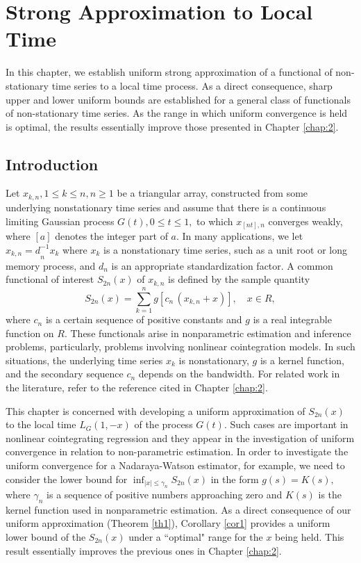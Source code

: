 \chapter{Strong Approximation to Local Time} 
\ifpdf
    \graphicspath{{Chapter3/Chapter3Figs/PNG/}{Chapter3/Chapter3Figs/PDF/}{Chapter3/Chapter3Figs/}}
\else
    \graphicspath{{Chapter3/Chapter3Figs/EPS/}{Chapter3/Chapter3Figs/}}
\fi

In this chapter, we establish uniform strong approximation of a functional of non-stationary time series to a local time process. As a direct consequence, sharp upper and lower uniform bounds are established for a general class of functionals of non-stationary time series. As the range in which uniform convergence is held is optimal, the results essentially improve those presented in Chapter \ref{chap:2}.

\section{Introduction}
Let ${x_{k,n},1\leq k\leq n,n\geq 1}$
 be  a triangular  array, constructed from some
underlying nonstationary time series and assume that there is a continuous
limiting Gaussian process $G(t),0\leq t\leq 1,$ to which $x_{[nt],n}$
converges weakly, where $[a]$ denotes the integer part of $a.$ In many applications, we let ${x_{k,n}=d}_{n}^{-1}{x}%
_{k}$ where $x_{k}$ is a nonstationary time series, such as a unit root or
long memory process, and $d_{n}$ is an appropriate standardization
factor. A common functional of interest $S_{2n}(x)$ of $x_{k,n}$ is defined by
the sample quantity%
\begin{equation}
S_{2n} (x)=\sum_{k=1}^{n}g[c_{n}\,(x_{k,n}+x)], \quad x\in R,
\end{equation}
where $c_{n}$ is a certain sequence of positive constants and $g$ is a real
integrable function on $R$. These functionals arise in nonparametric
estimation and inference  problems, particularly, problems involving nonlinear cointegration
models. In such situations, the underlying time series $x_{k}$ is nonstationary, $g$ is a
kernel function, and the secondary sequence $c_{n}$ depends on the bandwidth. For related work in the literature, refer to the reference cited in Chapter \ref{chap:2}.

This chapter is concerned with developing a uniform approximation of $S_{2n}(x)$ to the local time $L_{G}(1,-x)$ of the process $G(t)$. Such cases are important in nonlinear cointegrating regression and they appear in the investigation  of   uniform convergence in relation to  non-parametric estimation.  In order to investigate the uniform convergence for a Nadaraya-Watson estimator, for example, we need to consider the lower bound for $\inf _{|x|\le \gamma_n}S_{2n}(x)$ in
the form $g( s) =K( s),$ where $\gamma_n$ is a sequence of positive numbers approaching zero and $K(s) $ is the kernel function used in nonparametric estimation. As  a direct consequence of our uniform approximation  (Theorem \ref{th1}), Corollary \ref{cor1} provides a uniform lower  bound of the $S_{2n}(x)$ under  a ``optimal" range for the $x$ being held. This result essentially improves the previous ones in Chapter \ref{chap:2}. 

